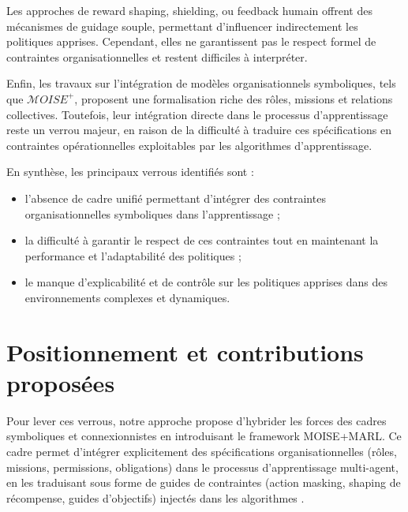 Les approches de reward shaping, shielding, ou feedback humain offrent des mécanismes de guidage souple, permettant d'influencer indirectement les politiques apprises. Cependant, elles ne garantissent pas le respect formel de contraintes organisationnelles et restent difficiles à interpréter.

Enfin, les travaux sur l'intégration de modèles organisationnels symboliques, tels que $\mathcal{M}OISE^+$, proposent une formalisation riche des rôles, missions et relations collectives. Toutefois, leur intégration directe dans le processus d'apprentissage  reste un verrou majeur, en raison de la difficulté à traduire ces spécifications en contraintes opérationnelles exploitables par les algorithmes d'apprentissage.

En synthèse, les principaux verrous identifiés sont :
\begin{itemize}
  \item l'absence de cadre unifié permettant d'intégrer des contraintes organisationnelles symboliques dans l'apprentissage  ;
  \item la difficulté à garantir le respect de ces contraintes tout en maintenant la performance et l'adaptabilité des politiques ;
  \item le manque d'explicabilité et de contrôle sur les politiques apprises dans des environnements complexes et dynamiques.
\end{itemize}

\section{Positionnement et contributions proposées}

Pour lever ces verrous, notre approche propose d'hybrider les forces des cadres symboliques et connexionnistes en introduisant le framework MOISE+MARL. Ce cadre permet d'intégrer explicitement des spécifications organisationnelles (rôles, missions, permissions, obligations) dans le processus d'apprentissage multi-agent, en les traduisant sous forme de guides de contraintes (action masking, shaping de récompense, guides d'objectifs) injectés dans les algorithmes .

